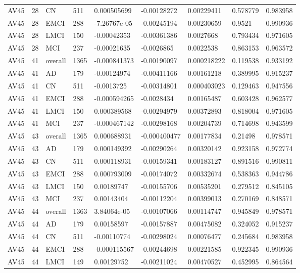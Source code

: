 \begin{landscape}
\begin{longtable}{lllllllll}
AV45 & 28 & CN & 511 & 0.000505699 & -0.00128272 & 0.00229411 & 0.578779 & 0.983958 \\
AV45 & 28 & EMCI & 288 & -7.26767e-05 & -0.00245194 & 0.00230659 & 0.9521 & 0.990936 \\
AV45 & 28 & LMCI & 150 & -0.00042353 & -0.00361386 & 0.0027668 & 0.793434 & 0.971605 \\
AV45 & 28 & MCI & 237 & -0.00021635 & -0.0026865 & 0.0022538 & 0.863153 & 0.963572 \\
AV45 & 41 & overall & 1365 & -0.000841373 & -0.00190097 & 0.000218222 & 0.119538 & 0.933192 \\
AV45 & 41 & AD & 179 & -0.00124974 & -0.00411166 & 0.00161218 & 0.389995 & 0.915237 \\
AV45 & 41 & CN & 511 & -0.0013725 & -0.00314801 & 0.000403023 & 0.129463 & 0.947556 \\
AV45 & 41 & EMCI & 288 & -0.000594265 & -0.0028434 & 0.00165487 & 0.603428 & 0.962577 \\
AV45 & 41 & LMCI & 150 & 0.000389568 & -0.00294979 & 0.00372893 & 0.818004 & 0.971605 \\
AV45 & 41 & MCI & 237 & -0.000467142 & -0.00298168 & 0.00204739 & 0.714698 & 0.943599 \\
AV45 & 43 & overall & 1365 & 0.000688931 & -0.000400477 & 0.00177834 & 0.21498 & 0.978571 \\
AV45 & 43 & AD & 179 & 0.000149392 & -0.00290264 & 0.00320142 & 0.923158 & 0.972774 \\
AV45 & 43 & CN & 511 & 0.000118931 & -0.00159341 & 0.00183127 & 0.891516 & 0.990811 \\
AV45 & 43 & EMCI & 288 & 0.000793009 & -0.00174072 & 0.00332674 & 0.538363 & 0.944786 \\
AV45 & 43 & LMCI & 150 & 0.00189747 & -0.00155706 & 0.00535201 & 0.279512 & 0.845105 \\
AV45 & 43 & MCI & 237 & 0.00143404 & -0.00112204 & 0.00399013 & 0.270169 & 0.848571 \\
AV45 & 44 & overall & 1363 & 3.84064e-05 & -0.00107066 & 0.00114747 & 0.945849 & 0.978571 \\
AV45 & 44 & AD & 179 & 0.00158597 & -0.00157887 & 0.00475082 & 0.324052 & 0.915237 \\
AV45 & 44 & CN & 511 & -0.00110774 & -0.00298024 & 0.00076477 & 0.245684 & 0.983958 \\
AV45 & 44 & EMCI & 288 & -0.000115567 & -0.00244698 & 0.00221585 & 0.922345 & 0.990936 \\
AV45 & 44 & LMCI & 149 & 0.00129752 & -0.00211024 & 0.00470527 & 0.452995 & 0.864564 \\

\end{longtable}
\end{landscape}
